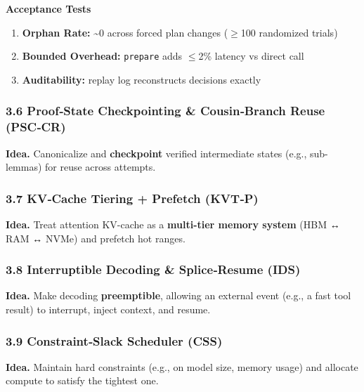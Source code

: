 \documentclass[
]{article}
\begin{document}
\textbf{Acceptance Tests}
\begin{enumerate}
\item \textbf{Orphan Rate:} \textasciitilde{}0 across forced plan
  changes (\ensuremath{\geq}100 randomized trials)
\item \textbf{Bounded Overhead:} \texttt{prepare} adds
  \ensuremath{\leq}2\% latency vs direct call
\item \textbf{Auditability:} replay log reconstructs decisions exactly
\end{enumerate}

\hypertarget{proofstate-checkpointing-cousinbranch-reuse-psccr}{%
\subsubsection{3.6 Proof‑State Checkpointing \& Cousin‑Branch Reuse
(PSC‑CR)}\label{proofstate-checkpointing-cousinbranch-reuse-psccr}}

\textbf{Idea.} Canonicalize and \textbf{checkpoint} verified
intermediate states (e.g., sub-lemmas) for reuse across attempts.

\hypertarget{kvcache-tiering-prefetch-kvtp}{%
\subsubsection{3.7 KV‑Cache Tiering + Prefetch
(KVT‑P)}\label{kvcache-tiering-prefetch-kvtp}}

\textbf{Idea.} Treat attention KV-cache as a \textbf{multi-tier memory
system} (HBM ↔ RAM ↔ NVMe) and prefetch hot ranges.

\hypertarget{interruptible-decoding-spliceresume-ids}{%
\subsubsection{3.8 Interruptible Decoding \& Splice‑Resume
(IDS)}\label{interruptible-decoding-spliceresume-ids}}

\textbf{Idea.} Make decoding \textbf{preemptible}, allowing an external
event (e.g., a fast tool result) to interrupt, inject context, and
resume.

\hypertarget{constraintslack-scheduler-css}{%
\subsubsection{3.9 Constraint‑Slack Scheduler
(CSS)}\label{constraintslack-scheduler-css}}

\textbf{Idea.} Maintain hard constraints (e.g., on model size, memory
usage) and allocate compute to satisfy the tightest one.
\end{document}
